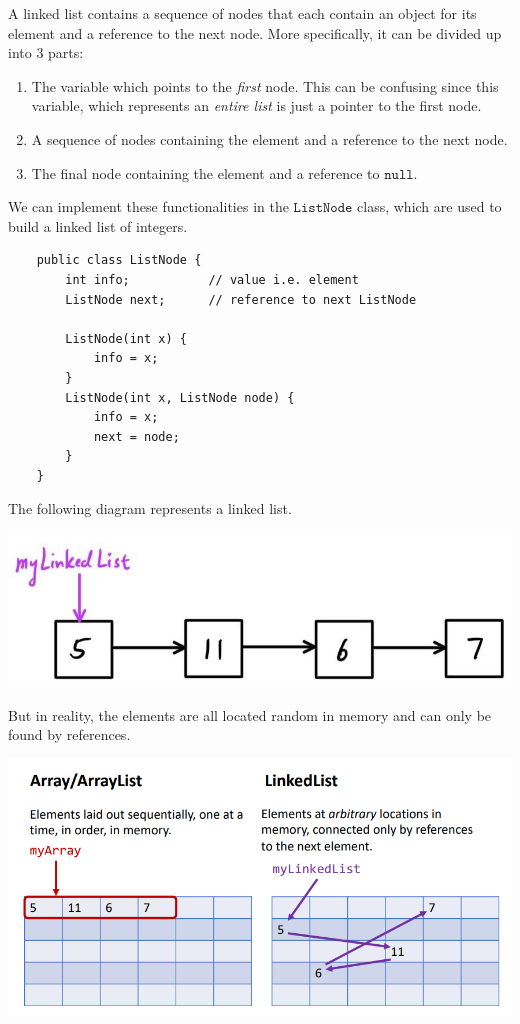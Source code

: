 \documentclass{article}
\begin{document}
    \begin{definition}
    A linked list contains a sequence of nodes that each contain an object for its element and a reference to the next node. More specifically, it can be divided up into 3 parts: 
    \begin{enumerate}
        \item The variable which points to the \textit{first} node. This can be confusing since this variable, which represents an \textit{entire list} is just a pointer to the first node. 
        \item A sequence of nodes containing the element and a reference to the next node. 
        \item The final node containing the element and a reference to $\texttt{null}$. 
    \end{enumerate}
    We can implement these functionalities in the $\texttt{ListNode}$ class, which are used to build a linked list of integers. 
    \begin{lstlisting}
    public class ListNode {
        int info;           // value i.e. element 
        ListNode next;      // reference to next ListNode
        
        ListNode(int x) {
            info = x; 
        }
        ListNode(int x, ListNode node) {
            info = x; 
            next = node; 
        }
    }
    \end{lstlisting}
    The following diagram represents a linked list. 
    \begin{center}
        \includegraphics[scale=0.3]{img/linked_list_diagram.jpg}
    \end{center}
    But in reality, the elements are all located random in memory and can only be found by references. 
    \begin{center}
        \includegraphics[scale=0.3]{img/linked_list_random_memory.png}
    \end{center}
    \end{definition}
\end{document}
